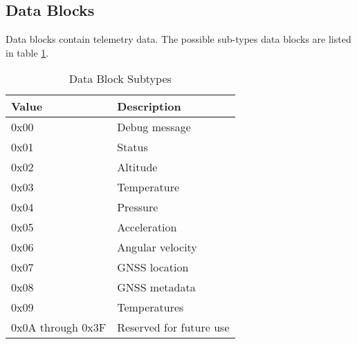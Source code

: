 \subsection{Data Blocks}

Data blocks contain telemetry data. The possible sub-types data blocks are listed in table \ref{table:data-subtypes}.

\begin{table}[H]
    \centering
    \begin{tabular}{@{}ll@{}}
        \toprule
        Value             & Description             \\
        \midrule
        0x00              & Debug message           \\
        0x01              & Status                  \\
        0x02              & Altitude                \\
        0x03              & Temperature             \\
        0x04              & Pressure                \\
        0x05              & Acceleration            \\
        0x06              & Angular velocity        \\
        0x07              & GNSS location           \\
        0x08              & GNSS metadata           \\
        0x09              & Temperatures            \\
        0x0A through 0x3F & Reserved for future use \\
        \bottomrule
    \end{tabular}
    \caption{Data Block Subtypes}
    \label{table:data-subtypes}
\end{table}










